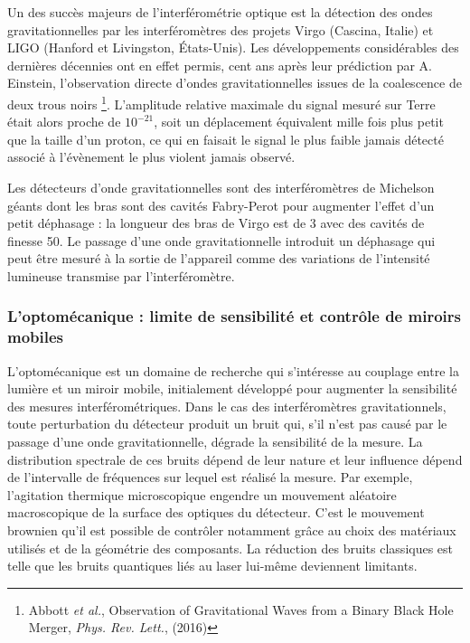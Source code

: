 \documentclass[12pt,a4paper]{article}
\begin{document}
Un des succès majeurs de l'interférométrie optique est la détection des ondes gravitationnelles par les interféromètres des projets Virgo (Cascina, Italie) et LIGO (Hanford et Livingston, États-Unis).
Les développements considérables des dernières décennies ont en effet permis, cent ans après leur prédiction par A. Einstein, l'observation directe d'ondes gravitationnelles issues de la coalescence de deux trous noirs
\footnote{Abbott \textit{et al.}, Observation of Gravitational Waves from a Binary Black Hole Merger, \textit{Phys. Rev. Lett.}, (2016)}.
L'amplitude relative maximale du signal mesuré sur Terre était alors proche de $10^{-21}$, soit un déplacement équivalent mille fois plus petit que la taille d'un proton, ce qui en faisait le signal le plus faible jamais détecté associé à l'évènement le plus violent jamais observé.

Les détecteurs d'onde gravitationnelles sont des interféromètres de Michelson géants dont les bras sont des cavités Fabry-Perot pour augmenter l'effet d'un petit déphasage : la longueur des bras de Virgo est de \unit{3}{\kilo\meter} avec des cavités de finesse 50.
Le passage d'une onde gravitationnelle introduit un déphasage qui peut être mesuré à la sortie de l'appareil comme des variations de l'intensité lumineuse transmise par l'interféromètre.

\subsubsection{L'optomécanique : limite de sensibilité et contrôle de miroirs mobiles}

L'optomécanique est un domaine de recherche qui s'intéresse au couplage entre la lumière et un miroir mobile, initialement développé pour augmenter la sensibilité des mesures interférométriques. 
Dans le cas des interféromètres gravitationnels, toute perturbation du détecteur produit un bruit qui, s'il n'est pas causé par le passage d'une onde gravitationnelle, dégrade la sensibilité de la mesure.
La distribution spectrale de ces bruits dépend de leur nature et leur influence dépend de l'intervalle de fréquences sur lequel est réalisé la mesure.
Par exemple, l'agitation thermique microscopique engendre un mouvement aléatoire macroscopique de la surface des optiques du détecteur.
C'est le mouvement brownien qu'il est possible de contrôler notamment grâce au choix des matériaux utilisés et de la géométrie des composants.
La réduction des bruits classiques est telle que les bruits quantiques liés au laser lui-même deviennent limitants.
\end{document}

